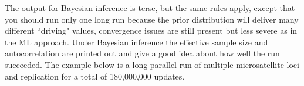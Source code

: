 %
The output for Bayesian inference is  terse, but the same rules apply, except that you should run only one long run because the prior distribution
will deliver many different ``driving" values, convergence issues are still present but less severe as in the ML approach. Under Bayesian inference the effective
sample size and autocorrelation are printed out and give a good idea about how well the run succeeded. The example below is a long parallel run of multiple microsatellite loci and replication for a total of 180,000,000 updates.
